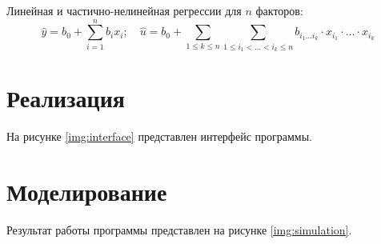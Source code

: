 \documentclass[a4paper, 14pt]{extreport}
\begin{document}
\begin{MainPart}
Линейная и частично-нелинейная регрессии для $n$ факторов:
\begin{equation}
	\hat y = b_0 + \sum_{i = 1}^{n}b_ix_i; \quad \hat u = b_0 + \sum_{1 \leqslant k \leqslant n}\sum_{1 \leqslant i_1 < \ldots < i_k \leqslant n}b_{i_1\ldots i_k}\cdot x_{i_1} \cdot \ldots \cdot x_{i_k}
\end{equation}

\section{Реализация}

На рисунке \ref{img:interface} представлен интерфейс программы.


\section{Моделирование}

Результат работы программы представлен на рисунке \ref{img:simulation}.



\end{MainPart}
\end{document}

